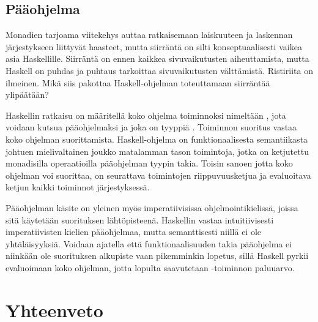 \documentclass[finnish]{tktltiki2}
\begin{document}
\subsection{Pääohjelma} %

Monadien tarjoama viitekehys auttaa ratkaisemaan laiskuuteen ja laskennan järjestykseen liittyvät
haasteet, mutta siirräntä on silti konseptuaalisesti vaikea asia Haskellille. Siirräntä on ennen
kaikkea sivuvaikutusten aiheuttamista, mutta Haskell on puhdas ja puhtaus tarkoittaa sivuvaikutusten
välttämistä. Ristiriita on ilmeinen. Mikä siis pakottaa Haskell-ohjelman toteuttamaan siirräntää
ylipäätään?


Haskellin ratkaisu on määritellä koko ohjelma toiminnoksi nimeltään , jota voidaan kutsua
pääohjelmaksi ja joka on tyyppiä . Toiminnon  suoritus vastaa koko ohjelman
suorittamista. Haskell-ohjelma on funktionaalisesta semantiikasta johtuen mielivaltainen joukko
matalamman tason toimintoja, jotka on ketjutettu monadisilla operaatioilla pääohjelman tyypin takia.
Toisin sanoen jotta koko ohjelman voi suorittaa, on seurattava toimintojen riippuvuusketjua ja
evaluoitava ketjun kaikki toiminnot järjestyksessä.

Pääohjelman käsite on yleinen myös imperatiivisissa ohjelmointikielissä, joissa sitä käytetään
suorituksen lähtöpisteenä. Haskellin  vastaa intuitiivisesti imperatiivisten kielien
pääohjelmaa, mutta semanttisesti niillä ei ole yhtäläisyyksiä. Voidaan ajatella että
funktionaalisuuden takia pääohjelma ei niinkään ole suorituksen alkupiste vaan pikemminkin lopetus,
sillä Haskell pyrkii evaluoimaan koko ohjelman, jotta lopulta saavutetaan -toiminnon
paluuarvo.



\section{Yhteenveto}


\end{document}
